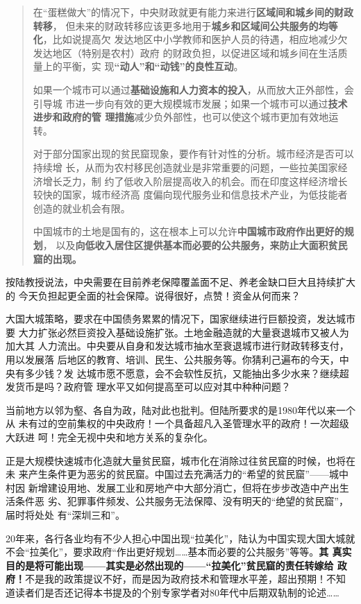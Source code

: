 \begin{enumerate}
\begin{quotation}
    在“蛋糕做大”的情况下，中央财政就更有能力来进行\textbf{区域间和城乡间的财政转移}，
    但未来的财政转移应该更多地用于\textbf{城乡和区域间公共服务的均等化}，比如说提高欠
    发达地区中小学教师和医护人员的待遇，相应地减少欠发达地区（特别是农村）政府
    的财政负担，以促进区域和城乡间在生活质量上的平衡，实
    现\textbf{“动人”和“动钱”的良性互动}。

    如果一个城市可以通过\textbf{基础设施和人力资本的投入}，从而放大正外部性，会引导城
    市进一步向有效的更大规模城市发展；如果一个城市可以通过\textbf{技术进步和政府的管
      理措施}减少负外部性，也可以使这个城市更加有效地运转。

    对于部分国家出现的贫民窟现象，要作有针对性的分析。城市经济是否可以持续增
    长，从而为农村移民创造就业是非常重要的问题，一些拉美国家经济增长乏力，制
    约了低收入阶层提高收入的机会。而在印度这样经济增长较快的国家，城市经济高
    度偏向现代服务业和信息技术产业，为低技能者创造的就业机会有限。

    中国城市的土地是国有的，这在根本上可以允许\textbf{中国城市政府作出更好的规划}，
    以及\textbf{向低收入居住区提供基本而必要的公共服务，来防止大面积贫民窟的出现。}
  \end{quotation}

  按陆教授说法，中央需要在目前养老保障覆盖面不足、养老金缺口巨大且持续扩大的
  今天负担起更全面的社会保障。说得很好，点赞！资金从何而来？

  大国大城策略，要求在中国债务累累的情况下，国家继续进行巨额投资，发达城市要
  大力扩张必然巨资投入基础设施扩张。土地金融造就的大量衰退城市又被人为加大其
  人力流出。中央要从自身和发达城市抽水至衰退城市进行财政转移支付，用以发展落
  后地区的教育、培训、民生、公共服务等。你猜利己遍布的今天，中央有多少钱？发
  达城市愿不愿意，会不会软性反抗，又能抽出多少水来？继续超发货币是吗？政府管
  理水平又如何提高至可以应对其中种种问题？

  当前地方以邻为壑、各自为政，陆对此也批判。但陆所要求的是1980年代以来一个从
  未有过的空前集权的中央政府！一个具备超凡入圣管理水平的政府！一次超级大跃进
  呵！完全无视中央和地方关系的复杂化。


  正是大规模快速城市化造就大量贫民窟，城市化在消除过往贫民窟的时候，也将在未
  来产生条件更为恶劣的贫民窟。中国过去充满活力的“希望的贫民窟”——城中村因
  新增建设用地、发展工业和房地产中大部分消亡，但将在步步改造中产出生活条件恶
  劣、犯罪事件频发、公共服务无法保障、没有明天的“绝望的贫民窟”，届时将处处
  有“深圳三和”。

  20年来，各行各业均有不少人担心中国出现“拉美化”，陆认为中国实现大国大城就
  不会“拉美化”，要求政府“作出更好规划……基本而必要的公共服务”等等。\textbf{其
    真实目的是将可能出现——其实是必然出现的——“拉美化”贫民窟的责任转嫁给
    政府！}不是我的政策提议不好，而是因为政府技术和管理水平差，超出预期！不知
  道读者们是否还记得本书提及的个别专家学者对80年代中后期双轨制的论述……



\end{enumerate}
